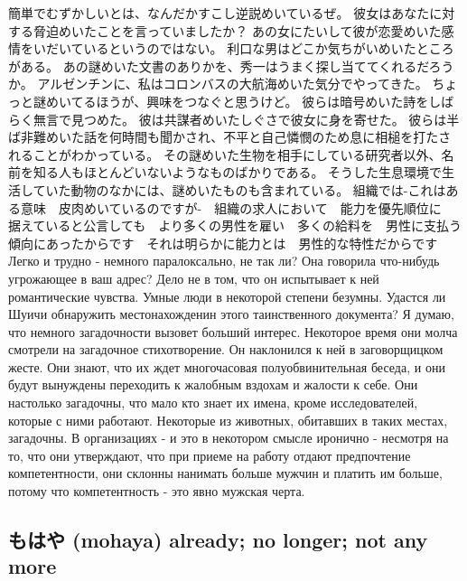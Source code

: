 簡単でむずかしいとは、なんだかすこし逆説めいているぜ。
彼女はあなたに対する脅迫めいたことを言っていましたか？
あの女にたいして彼が恋愛めいた感情をいだいているというのではない。
利口な男はどこか気ちがいめいたところがある。
あの謎めいた文書のありかを、秀一はうまく探し当ててくれるだろうか。
アルゼンチンに、私はコロンバスの大航海めいた気分でやってきた。
ちょっと謎めいてるほうが、興味をつなぐと思うけど。
彼らは暗号めいた詩をしばらく無言で見つめた。
彼は共謀者めいたしぐさで彼女に身を寄せた。
彼らは半ば非難めいた話を何時間も聞かされ、不平と自己憐憫のため息に相槌を打たされることがわかっている。
その謎めいた生物を相手にしている研究者以外、名前を知る人もほとんどいないようなものばかりである。
そうした生息環境で生活していた動物のなかには、謎めいたものも含まれている。
組織では-これはある意味　皮肉めいているのですが-　組織の求人において　能力を優先順位に　据えていると公言しても　より多くの男性を雇い　多くの給料を　男性に支払う傾向にあったからです　それは明らかに能力とは　男性的な特性だからです
Легко и трудно - немного паралоксально, не так ли?
Она говорила что-нибудь угрожающее в ваш адрес?
Дело не в том, что он испытывает к ней романтические чувства.
Умные люди в некоторой степени безумны.
Удастся ли Шуичи обнаружить местонахожденин этого таинственного документа?
Я думаю, что немного загадочности вызовет больший интерес.
Некоторое время они молча смотрели на загадочное стихотворение.
Он наклонился к ней в заговорщицком жесте.
Они знают, что их ждет многочасовая полуобвинительная беседа, и они будут вынуждены переходить к жалобным вздохам и жалости к себе.
Они настолько загадочны, что мало кто знает их имена, кроме исследователей, которые с ними работают.
Некоторые из животных, обитавших в таких местах, загадочны.
В организациях - и это в некотором смысле иронично - несмотря на то, что они утверждают, что при приеме на работу отдают предпочтение компетентности, они склонны нанимать больше мужчин и платить им больше, потому что компетентность - это явно мужская черта.

\subsection{もはや (mohaya) already; no longer; not any more}

